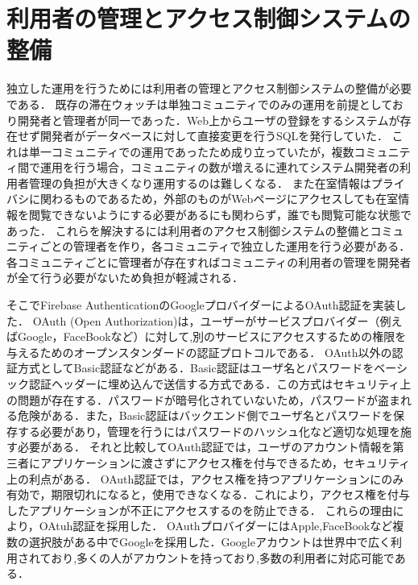 

\section{利用者の管理とアクセス制御システムの整備}\label{4.2}
独立した運用を行うためには利用者の管理とアクセス制御システムの整備が必要である．
既存の滞在ウォッチは単独コミュニティでのみの運用を前提としており開発者と管理者が同一であった．Web上からユーザの登録をするシステムが存在せず開発者がデータベースに対して直接変更を行うSQLを発行していた．
これは単一コミュニティでの運用であったため成り立っていたが，複数コミュニティ間で運用を行う場合，コミュニティの数が増えるに連れてシステム開発者の利用者管理の負担が大きくなり運用するのは難しくなる．
また在室情報はプライバシに関わるものであるため，外部のものがWebページにアクセスしても在室情報を閲覧できないようにする必要があるにも関わらず，誰でも閲覧可能な状態であった．
これらを解決するには利用者のアクセス制御システムの整備とコミュニティごとの管理者を作り，各コミュニティで独立した運用を行う必要がある．
各コミュニティごとに管理者が存在すればコミュニティの利用者の管理を開発者が全て行う必要がないため負担が軽減される．


そこでFirebase AuthenticationのGoogleプロバイダーによるOAuth認証を実装した．
OAuth (Open Authorization)は，ユーザーがサービスプロバイダー（例えばGoogle，FaceBookなど）に対して,別のサービスにアクセスするための権限を与えるためのオープンスタンダードの認証プロトコルである．
OAuth以外の認証方式としてBasic認証などがある．Basic認証はユーザ名とパスワードをベーシック認証ヘッダーに埋め込んで送信する方式である．この方式はセキュリティ上の問題が存在する．パスワードが暗号化されていないため，パスワードが盗まれる危険がある．また，Basic認証はバックエンド側でユーザ名とパスワードを保存する必要があり，管理を行うにはパスワードのハッシュ化など適切な処理を施す必要がある．
それと比較してOAuth認証では，ユーザのアカウント情報を第三者にアプリケーションに渡さずにアクセス権を付与できるため，セキュリティ上の利点がある．
OAuth認証では，アクセス権を持つアプリケーションにのみ有効で，期限切れになると，使用できなくなる．これにより，アクセス権を付与したアプリケーションが不正にアクセスするのを防止できる．
これらの理由により，OAtuh認証を採用した．
OAuthプロバイダーにはApple,FaceBookなど複数の選択肢がある中でGoogleを採用した．Googleアカウントは世界中で広く利用されており,多くの人がアカウントを持っており,多数の利用者に対応可能である．

